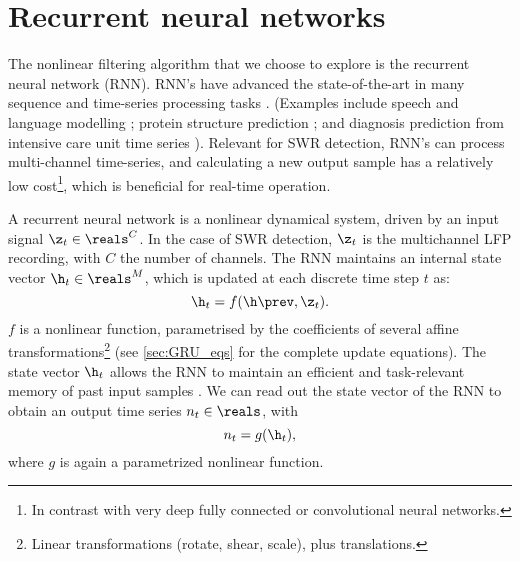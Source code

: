 \section{Recurrent neural networks}
\label{sec:RNNs}

The nonlinear filtering algorithm that we choose to explore is the recurrent neural network (RNN). RNN's have advanced the state-of-the-art in many sequence and time-series processing tasks \cite{Greff2017}. (Examples include speech and language modelling \cite{LeCun2015,Goodfellow2016}; protein structure prediction \cite{Sonderby2014}; and diagnosis prediction from intensive care unit time series \cite{Lipton2015}).\footnotemark{} Relevant for SWR detection, RNN's can process multi-channel time-series, and calculating a new output sample has a relatively low cost\footnote{In contrast with very deep fully connected or convolutional neural networks.}, which is beneficial for real-time operation.



A recurrent neural network is a nonlinear dynamical system, driven by an input signal $\z_t \in \reals^C$. In the case of SWR detection, $\z_t$ is the multichannel LFP recording, with $C$ the number of channels. The RNN maintains an internal state vector $\h_t \in \reals^M$, which is updated at each discrete time step $t$ as:
%
\begin{equation}
\label{eq:RNN_f}
\h_t = f(\h\prev, \z_t).
\end{equation}
%
$f$ is a nonlinear function, parametrised by the coefficients of several affine transformations\footnote{Linear transformations (rotate, shear, scale), plus translations.} (see \cref{sec:GRU_eqs} for the complete update equations). The state vector $\h_t$ allows the RNN to maintain an efficient and task-relevant memory of past input samples \cite{LeCun2015}.\footnotemark{} We can read out the state vector of the RNN to obtain an output time series $n_t \in \reals$, with
%
\begin{equation}
\label{eq:RNN_g}
n_t = g(\h_t),
\end{equation}
%
where $g$ is again a parametrized nonlinear function.

